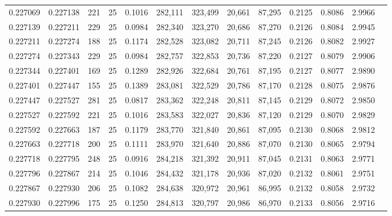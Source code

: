 \begin{tabular}{rrrrrrrrrrrrr}
0.227069 & 0.227138 &   221 &  25 &                                     0.1016 & 282,111 & 323,499 &  20,661 &  87,295 & 0.2125 & 0.8086 & 2.9966 \\
0.227139 & 0.227211 &   229 &  25 &                                     0.0984 & 282,340 & 323,270 &  20,686 &  87,270 & 0.2126 & 0.8084 & 2.9945 \\
0.227211 & 0.227274 &   188 &  25 &                                     0.1174 & 282,528 & 323,082 &  20,711 &  87,245 & 0.2126 & 0.8082 & 2.9927 \\
0.227274 & 0.227343 &   229 &  25 &                                     0.0984 & 282,757 & 322,853 &  20,736 &  87,220 & 0.2127 & 0.8079 & 2.9906 \\
0.227344 & 0.227401 &   169 &  25 &                                     0.1289 & 282,926 & 322,684 &  20,761 &  87,195 & 0.2127 & 0.8077 & 2.9890 \\
0.227401 & 0.227447 &   155 &  25 &                                     0.1389 & 283,081 & 322,529 &  20,786 &  87,170 & 0.2128 & 0.8075 & 2.9876 \\
0.227447 & 0.227527 &   281 &  25 &                                     0.0817 & 283,362 & 322,248 &  20,811 &  87,145 & 0.2129 & 0.8072 & 2.9850 \\
0.227527 & 0.227592 &   221 &  25 &                                     0.1016 & 283,583 & 322,027 &  20,836 &  87,120 & 0.2129 & 0.8070 & 2.9829 \\
0.227592 & 0.227663 &   187 &  25 &                                     0.1179 & 283,770 & 321,840 &  20,861 &  87,095 & 0.2130 & 0.8068 & 2.9812 \\
0.227663 & 0.227718 &   200 &  25 &                                     0.1111 & 283,970 & 321,640 &  20,886 &  87,070 & 0.2130 & 0.8065 & 2.9794 \\
0.227718 & 0.227795 &   248 &  25 &                                     0.0916 & 284,218 & 321,392 &  20,911 &  87,045 & 0.2131 & 0.8063 & 2.9771 \\
0.227796 & 0.227867 &   214 &  25 &                                     0.1046 & 284,432 & 321,178 &  20,936 &  87,020 & 0.2132 & 0.8061 & 2.9751 \\
0.227867 & 0.227930 &   206 &  25 &                                     0.1082 & 284,638 & 320,972 &  20,961 &  86,995 & 0.2132 & 0.8058 & 2.9732 \\
0.227930 & 0.227996 &   175 &  25 &                                     0.1250 & 284,813 & 320,797 &  20,986 &  86,970 & 0.2133 & 0.8056 & 2.9716 \\

\end{tabular}
